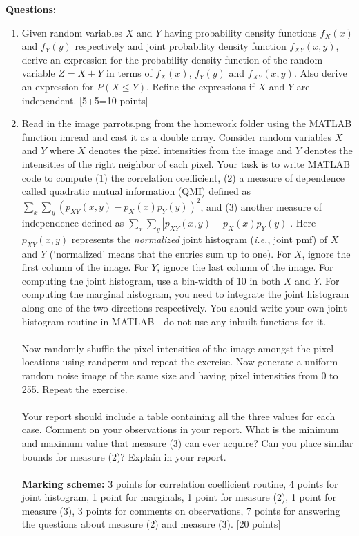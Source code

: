 \documentclass[11pt]{article}
\begin{document}
\textbf{Questions:}
\begin{enumerate}
\item Given random variables $X$ and $Y$ having probability density functions $f_X(x)$ and $f_Y(y)$ respectively and joint probability density function $f_{XY}(x,y)$, derive an expression for the probability density function of the random variable $Z = X+Y$ in terms of $f_X(x)$, $f_Y(y)$ and $f_{XY}(x,y)$. Also derive an expression for $P(X \leq Y)$. Refine the expressions if $X$ and $Y$ are independent. \textsf{[5+5=10 points]}

\item Read in the image parrots.png from the homework folder using the MATLAB function imread and cast it as a double array. Consider random variables $X$ and $Y$ where $X$ denotes the pixel intensities from the image and $Y$ denotes the intensities of the right neighbor of each pixel. Your task is to write MATLAB code to compute (1) the correlation coefficient, (2) a measure of dependence called quadratic mutual information (QMI) defined as $\sum_{x}\sum_{y} (p_{XY}(x,y)-p_X(x)p_Y(y))^2$, and (3) another measure of independence defined as $\sum_{x}\sum_{y} |p_{XY}(x,y)-p_X(x)p_Y(y)|$. Here $p_{XY}(x,y)$ represents the \emph{normalized} joint histogram (\textit{i.e.}, joint pmf) of $X$ and $Y$ (`normalized' means that the entries sum up to one). For $X$, ignore the first column of the image. For $Y$, ignore the last column of the image. For computing the joint histogram, use a bin-width of 10 in both $X$ and $Y$. For computing the marginal histogram, you need to integrate the joint histogram along one of the two directions respectively. You should write your own joint histogram routine in MATLAB - do not use any inbuilt functions for it. 
\\
\\
Now randomly shuffle the pixel intensities of the image amongst the pixel locations using randperm and repeat the exercise. Now generate a uniform random noise image of the same size and having pixel intensities from 0 to 255. Repeat the exercise. 
\\
\\
Your report should include a table containing all the three values for each case. Comment on your observations in your report. What is the minimum and maximum value that measure (3) can ever acquire? Can you place similar bounds for measure (2)? Explain in your report. 
\\
\\
\textbf{Marking scheme:} 3 points for correlation coefficient routine, 4 points for joint histogram, 1 point for marginals, 1 point for measure (2), 1 point for measure (3), 3 points for comments on observations, 7 points for answering the questions about measure (2) and measure (3).  \textsf{[20 points]}


\end{enumerate}
\end{document}
